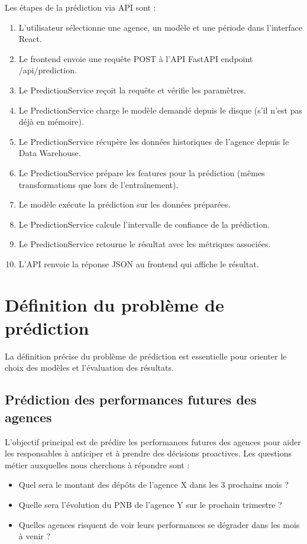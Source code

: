 Les étapes de la prédiction via API sont :

\begin{enumerate}
    \item L'utilisateur sélectionne une agence, un modèle et une période dans l'interface React.
    \item Le frontend envoie une requête POST à l'API FastAPI endpoint /api/prediction.
    \item Le PredictionService reçoit la requête et vérifie les paramètres.
    \item Le PredictionService charge le modèle demandé depuis le disque (s'il n'est pas déjà en mémoire).
    \item Le PredictionService récupère les données historiques de l'agence depuis le Data Warehouse.
    \item Le PredictionService prépare les features pour la prédiction (mêmes transformations que lors de l'entraînement).
    \item Le modèle exécute la prédiction sur les données préparées.
    \item Le PredictionService calcule l'intervalle de confiance de la prédiction.
    \item Le PredictionService retourne le résultat avec les métriques associées.
    \item L'API renvoie la réponse JSON au frontend qui affiche le résultat.
\end{enumerate}

\section{Définition du problème de prédiction}
\label{sec:sprint5-definition}

La définition précise du problème de prédiction est essentielle pour orienter le choix des modèles et l'évaluation des résultats.

\subsection{Prédiction des performances futures des agences}

L'objectif principal est de prédire les performances futures des agences pour aider les responsables à anticiper et à prendre des décisions proactives. Les questions métier auxquelles nous cherchons à répondre sont :

\begin{itemize}
    \item Quel sera le montant des dépôts de l'agence X dans les 3 prochains mois ?
    \item Quelle sera l'évolution du PNB de l'agence Y sur le prochain trimestre ?
    \item Quelles agences risquent de voir leurs performances se dégrader dans les mois à venir ?
\end{itemize}

